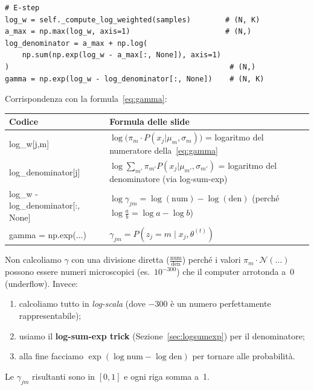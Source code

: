 \documentclass[11pt,a4paper]{article}
\begin{document}
\begin{lstlisting}[caption={E-step nel codice}]
# E-step
log_w = self._compute_log_weighted(samples)        # (N, K)
a_max = np.max(log_w, axis=1)                      # (N,)
log_denominator = a_max + np.log(
    np.sum(np.exp(log_w - a_max[:, None]), axis=1)
)                                                   # (N,)
gamma = np.exp(log_w - log_denominator[:, None])    # (N, K)
\end{lstlisting}

Corrispondenza con la formula~\eqref{eq:gamma}:

\begin{center}
\renewcommand{\arraystretch}{1.4}
\begin{tabular}{>{\ttfamily\small}p{6.5cm} p{7.5cm}}
\toprule
\textbf{Codice} & \textbf{Formula delle slide} \\
\midrule
log\_w[j,m] &
$\log\bigl(\pi_m \cdot P(x_j|\mu_m,\sigma_m)\bigr)$
= logaritmo del numeratore della~\eqref{eq:gamma} \\
log\_denominator[j] &
$\log\sum_{m'} \pi_{m'} P(x_j|\mu_{m'},\sigma_{m'})$
= logaritmo del denominatore (via log-sum-exp) \\
log\_w - log\_denominator[:, None] &
$\log\gamma_{jm} = \log(\text{num}) - \log(\text{den})$
(perch\'{e} $\log\frac{a}{b} = \log a - \log b$) \\
gamma = np.exp(...) &
$\gamma_{jm} = P(z_j{=}m \mid x_j, \theta^{(t)})$ \\
\bottomrule
\end{tabular}
\end{center}

\begin{tipbox}
Non calcoliamo $\gamma$ con una divisione diretta
($\frac{\text{num}}{\text{den}}$) perch\'{e} i valori
$\pi_m \cdot \mathcal{N}(\ldots)$ possono essere numeri
microscopici (es.\ $10^{-300}$) che il computer arrotonda a~0
(underflow). Invece:
\begin{enumerate}[nosep]
  \item calcoliamo tutto in \emph{log-scala} (dove $-300$ \`{e}
        un numero perfettamente rappresentabile);
  \item usiamo il \textbf{log-sum-exp trick} (Sezione~\ref{sec:logsumexp})
        per il denominatore;
  \item alla fine facciamo $\exp(\log\text{num} - \log\text{den})$
        per tornare alle probabilit\`{a}.
\end{enumerate}
Le $\gamma_{jm}$ risultanti sono in $[0,1]$ e ogni riga somma a~1.
\end{tipbox}
\end{document}
